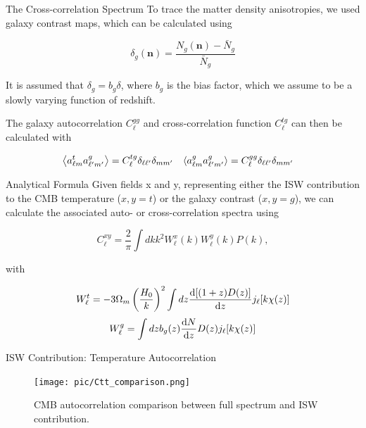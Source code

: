 \documentclass[serif, aspectratio=169]{beamer}
\begin{document}
\begin{frame}{The Cross-correlation Spectrum}
    To trace the matter density anisotropies, we used galaxy contrast maps, which can be calculated using

    \begin{equation}
        \delta_g(\mathbf{n})=\frac{N_g(\mathbf{n})-\bar{N}_g}{\bar{N}_g}
    \end{equation}

    It is assumed that $\delta_g=b_g\delta$, where $b_g$ is the bias factor, which we assume to be a slowly varying function of redshift. 

    The galaxy autocorrelation $C_{\ell}^{gg}$ and cross-correlation function $C_\ell^{tg}$ can then be calculated with

    \begin{align}
        \left\langle a_{\ell m}^t a_{\ell'm'}^g \right\rangle&=C_\ell^{tg}\delta_{\ell \ell'}\delta_{mm'} & \left\langle a_{\ell m}^g a_{\ell'm'}^g \right\rangle&=C_\ell^{gg}\delta_{\ell \ell'}\delta_{mm'}
    \end{align}
\end{frame}

\begin{frame}{Analytical Formula}
    Given fields x and y, representing either the ISW contribution to the CMB temperature ($x,y=t$) or the galaxy contrast ($x,y=g$), we can calculate the associated auto- or cross-correlation spectra using

    \begin{equation}
        C_\ell^{xy}=\frac{2}{\pi}\int dk k^2 W_\ell^x(k)W_\ell^y(k)P(k),
    \end{equation}

    with

    \begin{equation}
        W_\ell^t=-3\Omega_m\left(\frac{H_0}{k}\right)^2\int dz \dv{[(1+z)D(z)]}{z}j_\ell[k\chi(z)]
    \end{equation}
    \begin{equation}\label{Wg}
        W_\ell^g=\int dz b_g(z)\dv{N}{z}D(z)j_\ell[k\chi(z)]
    \end{equation}
\end{frame}

\begin{frame}{ISW Contribution: Temperature Autocorrelation}
    \begin{figure}
        \centering
        \texttt{[image: pic/Ctt\_comparison.png]}
        \caption{CMB autocorrelation comparison between full spectrum and ISW contribution.}
        \label{fig:ISWplots_Ctt}
    \end{figure}
\end{frame}
\end{document}
